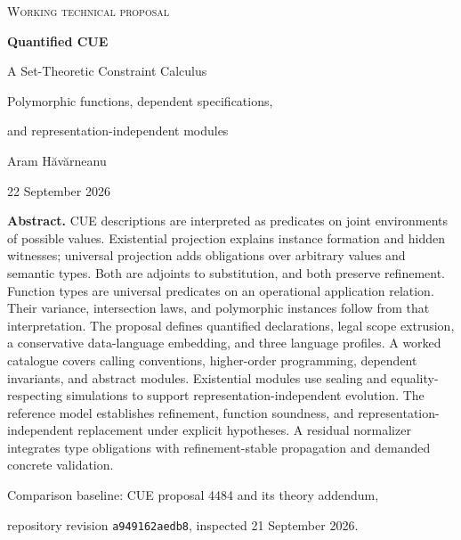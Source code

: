 \documentclass[11pt,a4paper,oneside]{report}
\theoremstyle{remark}
\begin{document}
\hypersetup{pageanchor=false}
\begin{titlepage}
\vspace*{16mm}
{\small\textsc{Working technical proposal}\par}
\vspace{12mm}
{\fontsize{31}{35}\selectfont\bfseries\color{ink}Quantified CUE\par}
\vspace{5mm}
{\Large A Set-Theoretic Constraint Calculus\par}
\vspace{3mm}
{\large Polymorphic functions, dependent specifications,\par
and representation-independent modules\par}
\vspace{17mm}
{\large Aram H\u{a}v\u{a}rneanu\par}
\vspace{2mm}
{22 September 2026\par}
\vfill
\begin{minipage}{\textwidth}
\textbf{Abstract.}
CUE descriptions are interpreted as predicates on joint environments of possible
values. Existential projection explains instance formation and hidden witnesses;
universal projection adds obligations over arbitrary values and semantic types.
Both are adjoints to substitution, and both preserve refinement. Function types
are universal predicates on an operational application relation. Their variance,
intersection laws, and polymorphic instances follow from that interpretation.
The proposal defines quantified declarations, legal scope extrusion, a
conservative data-language embedding, and three language profiles. A worked
catalogue covers calling conventions, higher-order programming, dependent
invariants, and abstract modules. Existential modules use sealing and
equality-respecting simulations to support representation-independent evolution.
The reference model establishes refinement, function soundness, and
representation-independent replacement under explicit hypotheses. A residual
normalizer integrates type obligations with refinement-stable propagation and
demanded concrete validation.
\end{minipage}\par
\vspace{8mm}
{\small Comparison baseline: CUE proposal 4484 and its theory addendum,\par
repository revision \texttt{a949162aedb8}, inspected 21 September 2026.\par}
\end{titlepage}
\hypersetup{pageanchor=true}
\tableofcontents
\clearpage
\end{document}
